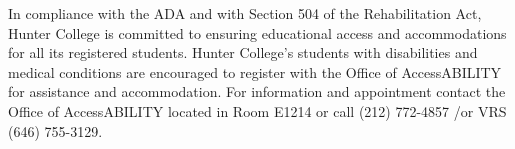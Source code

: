 In compliance with the ADA and with Section 504 of the Rehabilitation Act, Hunter College is committed to ensuring educational access and accommodations for all its registered students. Hunter College’s students with disabilities and medical conditions are encouraged to register with the Office of AccessABILITY for assistance and accommodation. For information and appointment contact the Office of AccessABILITY located in Room E1214 or call (212) 772-4857 /or VRS (646) 755-3129.
